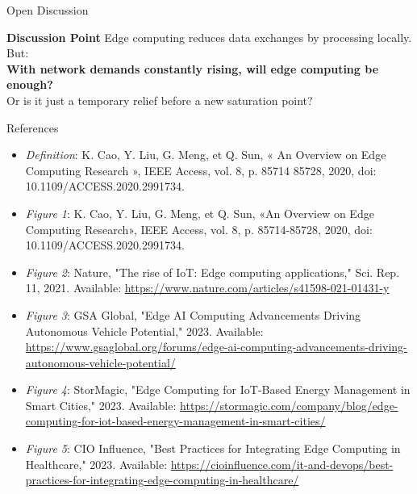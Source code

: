 \documentclass{beamer}
\begin{document}
\begin{frame}{Open Discussion}
  \begin{block}{\textbf{Discussion Point}}
    Edge computing reduces data exchanges by processing locally. But:\\
    \textbf{With network demands constantly rising, will edge computing be enough?}\\
    Or is it just a temporary relief before a new saturation point?
  \end{block}
\end{frame}

\begin{frame}{References}
    \footnotesize
    \begin{itemize}
        \item \textit{Definition}: K. Cao, Y. Liu, G. Meng, et Q. Sun, « An Overview on Edge Computing Research », IEEE Access, vol. 8, p. 85714 85728, 2020, doi: 10.1109/ACCESS.2020.2991734.
        \item \textit{Figure 1}: K. Cao, Y. Liu, G. Meng, et Q. Sun, «An Overview on Edge Computing Research», IEEE Access, vol. 8, p. 85714-85728, 2020, doi: 10.1109/ACCESS.2020.2991734.
        \item \textit{Figure 2}: Nature, "The rise of IoT: Edge computing applications," Sci. Rep. 11, 2021. Available: \url{https://www.nature.com/articles/s41598-021-01431-y}
        \item \textit{Figure 3}: GSA Global, "Edge AI Computing Advancements Driving Autonomous Vehicle Potential," 2023. Available: \url{https://www.gsaglobal.org/forums/edge-ai-computing-advancements-driving-autonomous-vehicle-potential/}
        \item \textit{Figure 4}: StorMagic, "Edge Computing for IoT-Based Energy Management in Smart Cities," 2023. Available: \url{https://stormagic.com/company/blog/edge-computing-for-iot-based-energy-management-in-smart-cities/}
        \item \textit{Figure 5}: CIO Influence, "Best Practices for Integrating Edge Computing in Healthcare," 2023. Available: \url{https://cioinfluence.com/it-and-devops/best-practices-for-integrating-edge-computing-in-healthcare/}
    \end{itemize}
\end{frame}
\end{document}

